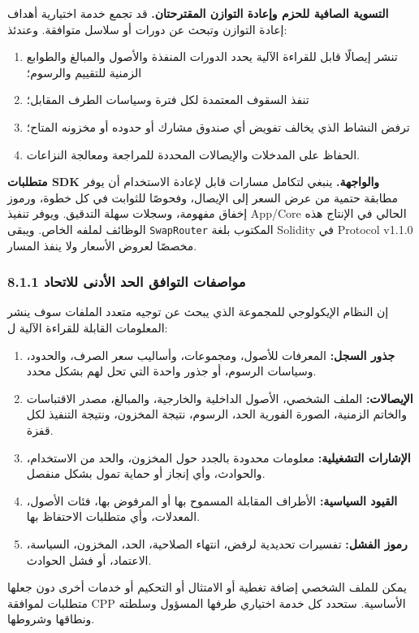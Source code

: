 \documentclass[11pt]{article}
\begin{document}
\textbf{التسوية الصافية للحزم وإعادة التوازن المقترحتان.} قد تجمع خدمة اختيارية أهداف إعادة التوازن وتبحث عن دورات أو سلاسل متوافقة. وعندئذ:

\begin{enumerate}[leftmargin=*]
\item تنشر إيصالًا قابل للقراءة الآلية يحدد الدورات المنفذة والأصول والمبالغ والطوابع الزمنية للتقييم والرسوم؛
\item تنفذ السقوف المعتمدة لكل فترة وسياسات الطرف المقابل؛
\item ترفض النشاط الذي يخالف تفويض أي صندوق مشارك أو حدوده أو مخزونه المتاح؛
\item الحفاظ على المدخلات والإيصالات المحددة للمراجعة ومعالجة النزاعات.
\end{enumerate}
\textbf{متطلبات SDK والواجهة.} ينبغي لتكامل مسارات قابل لإعادة الاستخدام أن يوفر مطابقة حتمية من عرض السعر إلى الإيصال، وفحوصًا للثوابت في كل خطوة، ورموز إخفاق مفهومة، وسجلات سهلة التدقيق. ويوفر تنفيذ App/Core الحالي في الإنتاج هذه الوظائف لملفه الخاص. ويبقى \texttt{SwapRouter} المكتوب بلغة Solidity في Protocol v1.1.0 مخصصًا لعروض الأسعار ولا ينفذ المسار.

\subsubsection*{8.1.1 مواصفات التوافق الحد الأدنى للاتحاد}

إن النظام الإيكولوجي للمجموعة الذي يبحث عن توجيه متعدد الملفات سوف ينشر المعلومات القابلة للقراءة الآلية ل:

\begin{enumerate}[leftmargin=*]
\item \textbf{جذور السجل:} المعرفات للأصول، ومجموعات، وأساليب سعر الصرف، والحدود، وسياسات الرسوم، أو جذور واحدة التي تحل لهم بشكل محدد.
\item \textbf{الإيصالات:} الملف الشخصي، الأصول الداخلية والخارجية، والمبالغ، مصدر الاقتباسات والخاتم الزمنية، الصورة الفورية الحد، الرسوم، نتيجة المخزون، ونتيجة التنفيذ لكل قفزة.
\item \textbf{الإشارات التشغيلية:} معلومات محدودة بالجدد حول المخزون، والحد من الاستخدام، والحوادث، وأي إنجاز أو حماية تمول بشكل منفصل.
\item \textbf{القيود السياسية:} الأطراف المقابلة المسموح بها أو المرفوض بها، فئات الأصول، المعدلات، وأي متطلبات الاحتفاظ بها.
\item \textbf{رموز الفشل:} تفسيرات تحديدية لرفض، انتهاء الصلاحية، الحد، المخزون، السياسة، الاعتماد، أو فشل الحوادث.
\end{enumerate}
يمكن للملف الشخصي إضافة تغطية أو الامتثال أو التحكيم أو خدمات أخرى دون جعلها متطلبات لموافقة CPP الأساسية. ستحدد كل خدمة اختياري طرفها المسؤول وسلطته ونطاقها وشروطها.
\end{document}
